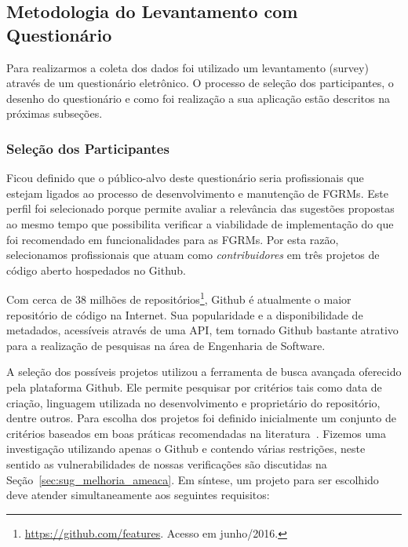 \subsection{Metodologia do Levantamento com Questionário}
\label{sub:sug_melhoria_metodologia_levantamento}

Para realizarmos a coleta dos dados foi utilizado um levantamento (survey)
através de um questionário eletrônico. O processo de seleção dos participantes,
o desenho do questionário e como foi realização a sua aplicação estão descritos
na próximas subseções.

\subsubsection{Seleção dos Participantes}
\label{ssub:sug_melhoria_selecao_participantes}

Ficou definido que o público-alvo deste questionário seria profissionais que
estejam ligados ao processo de desenvolvimento e manutenção de FGRMs. Este
perfil foi selecionado porque permite avaliar a relevância das sugestões
propostas ao mesmo tempo que possibilita verificar a viabilidade de
implementação do que foi recomendado em funcionalidades para as FGRMs. Por esta
razão, selecionamos profissionais que atuam como \textit{contribuidores} em três
projetos de código aberto hospedados no Github.

Com cerca de 38 milhões de
repositórios\footnote{\url{https://github.com/features}. Acesso em junho/2016.},
Github é atualmente o maior repositório de código na Internet. Sua popularidade
e a disponibilidade de metadados, acessíveis através de uma API, tem tornado
Github bastante atrativo para a realização de pesquisas na área de Engenharia de
Software.

A seleção dos possíveis projetos utilizou a ferramenta de busca avançada
oferecido pela plataforma Github. Ele permite pesquisar por critérios tais como
data de criação, linguagem utilizada no desenvolvimento e proprietário do
repositório, dentre outros. Para escolha dos projetos foi definido inicialmente
um conjunto de critérios baseados em boas práticas recomendadas na
literatura~\cite{Bird2009}. Fizemos uma investigação utilizando apenas o Github
e contendo várias restrições, neste sentido as vulnerabilidades de nossas
verificações são discutidas na Seção~\ref{sec:sug_melhoria_ameaca}. Em síntese,
um projeto para ser escolhido deve atender simultaneamente aos seguintes
requisitos:

